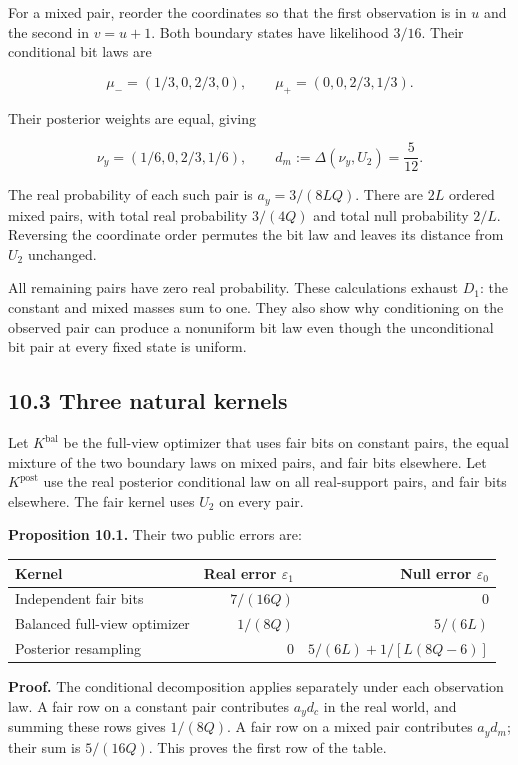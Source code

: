 \documentclass[
]{article}
\begin{document}
For a mixed pair, reorder the coordinates so that the first observation
is in \(u\) and the second in \(v=u+1\). Both boundary states have
likelihood \(3/16\). Their conditional bit laws are

\[
\mu_-=(1/3,0,2/3,0),\qquad
\mu_+=(0,0,2/3,1/3).
\]

Their posterior weights are equal, giving

\[
\nu_y=(1/6,0,2/3,1/6),\qquad
d_m:=\Delta(\nu_y,U_2)=\frac5{12}.
\]

The real probability of each such pair is \(a_y=3/(8LQ)\). There are
\(2L\) ordered mixed pairs, with total real probability \(3/(4Q)\) and
total null probability \(2/L\). Reversing the coordinate order permutes
the bit law and leaves its distance from \(U_2\) unchanged.

All remaining pairs have zero real probability. These calculations
exhaust \(D_1\): the constant and mixed masses sum to one. They also
show why conditioning on the observed pair can produce a nonuniform bit
law even though the unconditional bit pair at every fixed state is
uniform.

\subsection{10.3 Three natural kernels}\label{three-natural-kernels}

Let \(K^{\mathrm{bal}}\) be the full-view optimizer that uses fair bits
on constant pairs, the equal mixture of the two boundary laws on mixed
pairs, and fair bits elsewhere. Let \(K^{\mathrm{post}}\) use the real
posterior conditional law on all real-support pairs, and fair bits
elsewhere. The fair kernel uses \(U_2\) on every pair.

\textbf{Proposition 10.1.} Their two public errors are:

\begin{longtable}[]{@{}lrr@{}}
\toprule\noalign{}
Kernel & Real error \(\varepsilon_1\) & Null error \(\varepsilon_0\) \\
\midrule\noalign{}
\endhead
\bottomrule\noalign{}
\endlastfoot
Independent fair bits & \(7/(16Q)\) & \(0\) \\
Balanced full-view optimizer & \(1/(8Q)\) & \(5/(6L)\) \\
Posterior resampling & \(0\) & \(5/(6L)+1/[L(8Q-6)]\) \\
\end{longtable}

\textbf{Proof.} The conditional decomposition applies separately under
each observation law. A fair row on a constant pair contributes
\(a_y d_c\) in the real world, and summing these rows gives \(1/(8Q)\).
A fair row on a mixed pair contributes \(a_y d_m\); their sum is
\(5/(16Q)\). This proves the first row of the table.
\end{document}
